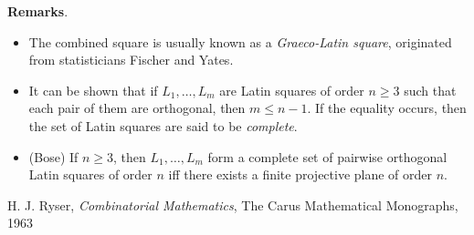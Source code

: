 \documentclass[12pt]{article}
\begin{document}
\textbf{Remarks}.  
\begin{itemize}
\item The combined square is usually known as a \emph{Graeco-Latin square}, originated from statisticians Fischer and Yates.
\item It can be shown that if $L_1,\ldots, L_m$ are Latin squares of order $n\ge 3$ such that each pair of them are orthogonal, then $m\le n-1$.  If the equality occurs, then the set of Latin squares are said to be \emph{complete}.
\item (Bose) If $n\ge 3$, then $L_1,\ldots,L_m$ form a complete set of pairwise orthogonal Latin squares of order $n$ iff there exists a finite projective plane of order $n$.
\end{itemize}

\begin{thebibliography}{9}
 H. J. Ryser, \emph{Combinatorial Mathematics}, The Carus Mathematical Monographs, 1963
\end{thebibliography}
\end{document}

